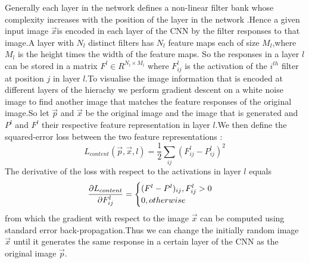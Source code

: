 \documentclass[10pt,a4paper]{article}
\begin{document}
	Generally each layer in the network defines a non-linear filter bank whose 
	complexity increases with the position of the layer in the network .Hence a given input image $\overrightarrow{x}$is encoded in each layer of the CNN by the filter responses to that image.A layer with $N_l$ distinct filters has
	$N_l$ feature maps each of size $M_l$,where $M_l$ is the height times 
	the width of the feature maps. So the responses in a layer $l$ can be stored in a matrix $F^l \in R^{N_l\times M_l}$ where $F_{ij}^{l}$ is the 
	activation of the $i^{th}$ filter at position $j$ in layer $l$.To visualise
	the image information that is encoded at different layers of the hierachy we perform gradient descent on a white noise image to find another image 
	that matches the feature responses of the original image.So let $\overrightarrow{p}$ and $\overrightarrow{x}$ be the original image and the image that is generated and $P^l$ and $F^l$ their respective feature 
	representation in layer $l$.We then define the squared-error loss between the two feature representations :
	\begin{equation}
	L_{content} (\overrightarrow{p},\overrightarrow{x},l)= \frac{1}{2} \sum_{ij}
	(F_{ij}^{l}-P_{ij}^{l})^2
	\end{equation}
	The derivative of the loss with respect to the activations in layer $l$
	equals
	\begin{eqnarray}
	\dfrac{\partial L_{content}}{\partial F_{ij}^l}=\begin{cases}
	(F^l-P^l)_{ij} ,F_{ij}^l>0 \cr 0,otherwise
	\end{cases}
	\end{eqnarray}
	from which the gradient with respect to the image $\overrightarrow{x}$ can be computed using standard error back-propagation.Thus we can change the initially random image $\overrightarrow{x}$ until it generates the 
	same response in a certain layer of the CNN as the original image $\overrightarrow{p}$.
	
\end{document}
